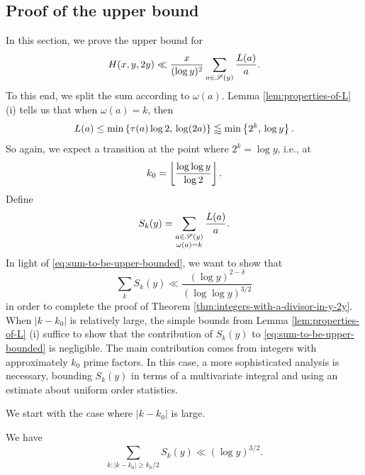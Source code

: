 \subsection{Proof of the upper bound}
In this section, we prove the upper bound for
\begin{equation} \label{eq:sum-to-be-upper-bounded}
    H(x, y, 2y) \ll \frac{x}{(\log y)^2} \sum \limits_{a \in \mathscr{S}(y)} \frac{L(a)}{a}.
\end{equation}
To this end, we split the sum according to $\omega(a)$. 
Lemma \ref{lem:properties-of-L} (i) tells us that when $\omega(a) = k$, then 
\begin{equation*}
    L(a) \le \min\left\{\tau(a) \log 2,\, \log (2a)\right\} \lessapprox \min \left\{2^k,\, \log y\right\}.
\end{equation*}
So again, we expect a transition at the point where $2^k = \log y$, i.e., at 
\begin{equation*}
    k_0 = \left\lfloor \frac{\log \log y}{\log 2} \right\rfloor.
\end{equation*}
Define
\begin{equation*}
    S_k(y) = \sum \limits_{\substack{a \in \mathscr{S}(y)\\\omega(a) = k}} \frac{L(a)}{a}.
\end{equation*}
In light of \eqref{eq:sum-to-be-upper-bounded}, we want to show that 
\begin{equation*}
    \sum \limits_{k} S_k(y) \ll \frac{(\log y)^{2- \delta}}{(\log \log y)^{3/2}}
\end{equation*}
in order to complete the proof of Theorem \ref{thm:integers-with-a-divisor-in-y-2y}.
When $|k - k_0|$ is relatively large, the simple bounds from Lemma \ref{lem:properties-of-L} (i) suffice to show that the contribution of $S_k(y)$ to \eqref{eq:sum-to-be-upper-bounded} is negligible. 
The main contribution comes from integers with approximately $k_0$ prime factors.
In this case, a more sophisticated analysis is necessary, bounding $S_k(y)$ in terms of a multivariate integral and using an estimate about uniform order statistics. 

We start with the case where $|k - k_0|$ is large.
\begin{lemma} \label{lem:bound-case-where-k-k0-is-large}
    We have 
    \begin{equation*}
        \sum \limits_{k\colon \left|k - k_0\right| \ge k_0/2} S_k(y) \ll (\log y)^{3/2}.
    \end{equation*}
\end{lemma}

